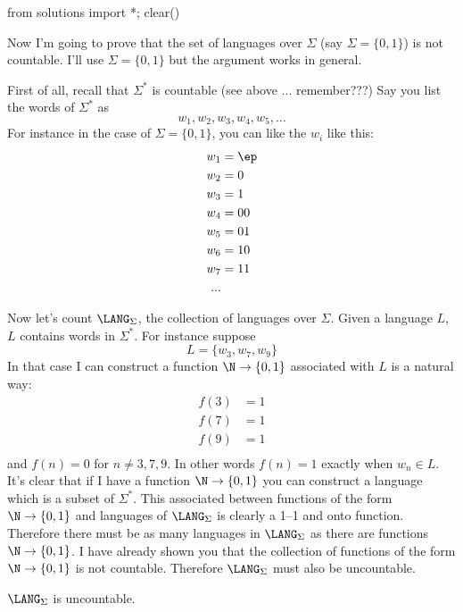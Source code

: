 \begin{python0}
from solutions import *; clear()
\end{python0}
Now I'm going to prove that the 
set of languages over $\Sigma$ (say $\Sigma = \{0, 1\}$)
is not countable.
I'll use $\Sigma = \{0, 1\}$ but the argument works in general.

First of all, recall that $\Sigma^*$ is countable
(see above ... remember???)
Say you list the words of $\Sigma^*$ as
\[
w_1, w_2, w_3, w_4, w_5, \ldots
\]
For instance in the case of $\Sigma = \{0, 1\}$,
you can like the $w_i$ like this:
\begin{align*}
w_1 &= \ep \\
w_2 &= 0 \\
w_3 &= 1 \\
w_4 &= 00 \\
w_5 &= 01 \\
w_6 &= 10 \\
w_7 &= 11 \\
...
\end{align*}


Now let's count $\LANG_\Sigma$, the collection of languages over $\Sigma$.
Given a language $L$,
$L$ contains words in $\Sigma^*$.
For instance suppose
\[
L = \{w_3, w_7, w_9\}
\]
In that case I can construct a function $\N \rightarrow \{0,1\}$
associated with $L$ is a natural way:
\begin{align*}
f(3) &= 1 \\
f(7) &= 1 \\
f(9) &= 1 \\
\end{align*}
and $f(n) = 0$ for $n \neq 3, 7, 9$.
In other words 
$f(n) = 1$ exactly when $w_n \in L$.
It's clear that if I have a function $\N \rightarrow \{0, 1\}$
you can construct a language which is a subset of $\Sigma^*$.
This associated between functions of the form $\N \rightarrow \{0, 1\}$
and languages of $\LANG_\Sigma$ is clearly
a 1--1 and onto function.
Therefore 
there must be as many languages in $\LANG_\Sigma$
as there are functions $\N\rightarrow \{0, 1\}$.
I have already shown you that the collection of functions
of the form $\N \rightarrow \{0,1\}$ is not countable.
Therefore $\LANG_\Sigma$ must also be uncountable.

\begin{thm}
$\LANG_\Sigma$ 
is uncountable.
\end{thm}



